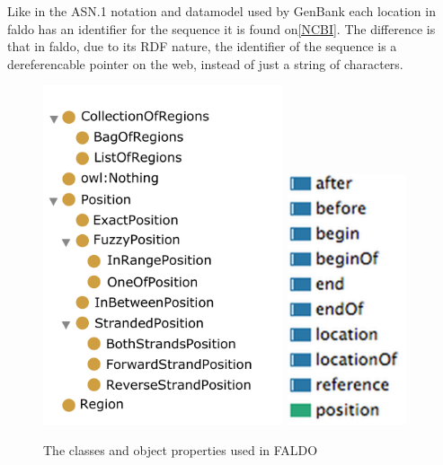 Like in the ASN.1 notation and datamodel used by GenBank each location in faldo has an identifier for the sequence it is found on\ref{NCBI}.
The difference is that in faldo, due to its RDF nature, the identifier of the sequence is a dereferencable pointer on the web, instead of just a string of characters.


\begin{figure}
\begin{center}
\includegraphics[height=10cm]{figures/classes.pdf}
\includegraphics[width=3.5cm]{figures/properties.pdf}
\end{center}
\caption{The classes and object properties used in FALDO}
\label{fig:ontology}
\end{figure}


